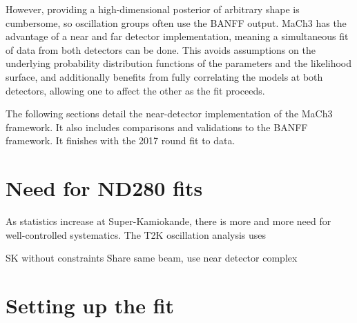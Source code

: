 However, providing a high-dimensional posterior of arbitrary shape is cumbersome, so oscillation groups often use the BANFF output. MaCh3 has the advantage of a near and far detector implementation, meaning a simultaneous fit of data from both detectors can be done. This avoids assumptions on the underlying probability distribution functions of the parameters and the likelihood surface, and additionally benefits from fully correlating the models at both detectors, allowing one to affect the other as the fit proceeds.

The following sections detail the near-detector implementation of the MaCh3 framework. It also includes comparisons and validations to the BANFF framework. It finishes with the 2017 round fit to data.

\section{Need for ND280 fits}
As statistics increase at Super-Kamiokande, there is more and more need for well-controlled systematics. The T2K oscillation analysis uses 

SK without constraints
Share same beam, use near detector complex

\section{Setting up the fit}



